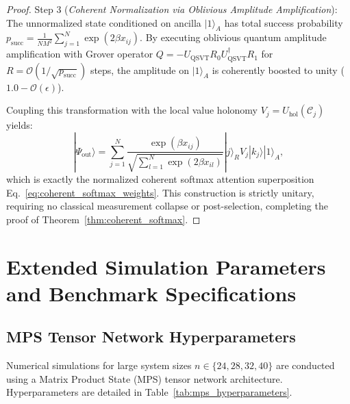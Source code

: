 \documentclass{article}
\begin{document}
\begin{proof}
Step 3 (\emph{Coherent Normalization via Oblivious Amplitude Amplification}): The unnormalized state conditioned on ancilla $|1\rangle_A$ has total success probability $p_{\mathrm{succ}} = \frac{1}{N M^2} \sum_{j=1}^N \exp(2\beta x_{ij})$. By executing oblivious quantum amplitude amplification with Grover operator $Q = -U_{\mathrm{QSVT}} R_0 U_{\mathrm{QSVT}}^\dagger R_1$ for $R = \mathcal{O}(1/\sqrt{p_{\mathrm{succ}}})$ steps, the amplitude on $|1\rangle_A$ is coherently boosted to unity ($1.0 - \mathcal{O}(\epsilon)$).

Coupling this transformation with the local value holonomy $V_j = U_{\mathrm{hol}}(\mathcal{C}_j)$ yields:
\begin{equation}
|\Psi_{\mathrm{out}}\rangle = \sum_{j=1}^N \frac{\exp(\beta x_{ij})}{\sqrt{\sum_{l=1}^N \exp(2\beta x_{il})}} |j\rangle_R V_j |k_j\rangle |1\rangle_A,
\end{equation}
which is exactly the normalized coherent softmax attention superposition Eq.~\eqref{eq:coherent_softmax_weights}. This construction is strictly unitary, requiring no classical measurement collapse or post-selection, completing the proof of Theorem~\ref{thm:coherent_softmax}.
\end{proof}

\section{Extended Simulation Parameters and Benchmark Specifications}
\label{sec:appendix_simulation_details}

\subsection{MPS Tensor Network Hyperparameters}
\label{sec:mps_details}

Numerical simulations for large system sizes $n \in \{24, 28, 32, 40\}$ are conducted using a Matrix Product State (MPS) tensor network architecture. Hyperparameters are detailed in Table~\ref{tab:mps_hyperparameters}.
\end{document}
